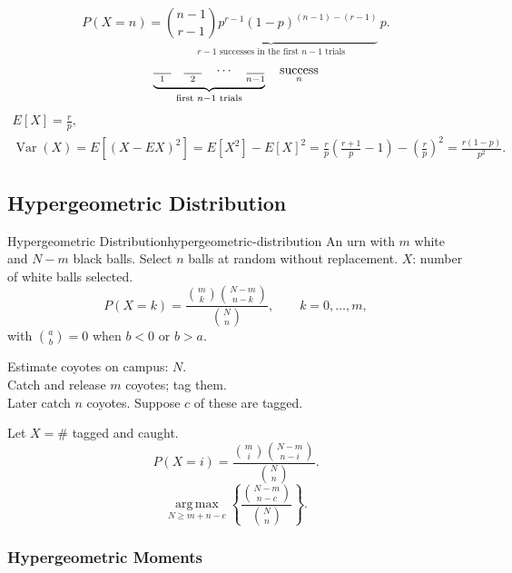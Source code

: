 \[
  P(X=n)=\underbrace{\binom{n-1}{r-1}p^{r-1}(1-p)^{(n-1)-(r-1)}}_{r-1\text{ successes in the first }n-1\text{ trials}}\,p.
\]
\[
  \underbrace{\underset{1}{\rule{.5cm}{.4pt}}\quad
    \underset{2}{\rule{.5cm}{.4pt}}\quad\cdots\quad
    \underset{n-1}{\rule{.5cm}{.4pt}}}_{\text{first }n-1\text{ trials}}
  \quad\underset{n}{\text{success}}
\]
\begin{gather*}
  E[X]=\frac rp,\\
  \operatorname{Var}(X)=E[(X-EX)^2]=E[X^2]-E[X]^2
  =\frac rp\left(\frac{r+1}p-1\right)-\left(\frac rp\right)^2
  =\frac{r(1-p)}{p^2}.
\end{gather*}

\subsection{Hypergeometric Distribution}

\begin{definition}{Hypergeometric Distribution}{hypergeometric-distribution}
  An urn with $m$ white and $N-m$ black balls. Select $n$ balls at random
  without replacement. $X$: number of white balls selected.
  \[
    P(X=k)=\frac{\binom mk\binom{N-m}{n-k}}{\binom Nn},
    \qquad k=0,\ldots,m,
  \]
  with $\binom ab=0$ when $b<0$ or $b>a$.
\end{definition}

\begin{example}
  Estimate coyotes on campus: $N$.\\
  Catch and release $m$ coyotes; tag them.\\
  Later catch $n$ coyotes. Suppose $c$ of these are tagged.

  Let $X=\#$ tagged and caught.
  \[
    P(X=i)=\frac{\binom mi\binom{N-m}{n-i}}{\binom Nn}.
  \]
  \[
    \operatorname*{arg\,max}_{N\ge m+n-c}
    \left\{\frac{\binom{N-m}{n-c}}{\binom Nn}\right\}.
  \]
\end{example}

\subsubsection{Hypergeometric Moments}

